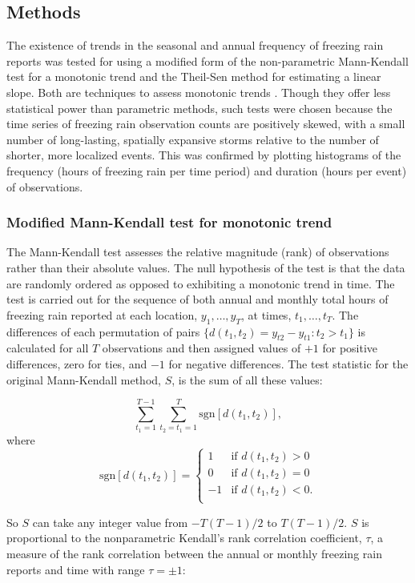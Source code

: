 \documentclass[twocol]{ametsoc}
\begin{document}
\subsection{Methods}
The existence of trends in the seasonal and annual frequency of freezing rain reports was tested for using a modified form of the non-parametric Mann-Kendall test for a monotonic trend and the Theil-Sen method for estimating a linear slope. Both are techniques to assess monotonic trends \citep{chandler2011statistical}. Though they offer less statistical power than parametric methods, such tests were chosen because the time series of freezing rain observation counts are positively skewed, with a small number of long-lasting, spatially expansive storms relative to the number of shorter, more localized events. This was confirmed by plotting histograms of the frequency (hours of freezing rain per time period) and duration (hours per event) of observations.

\subsubsection{Modified Mann-Kendall test for monotonic trend}
The Mann-Kendall test assesses the relative magnitude (rank) of observations rather than their absolute values. The null hypothesis of the test is that the data are randomly ordered as opposed to exhibiting a monotonic trend in time. The test is carried out for the sequence of both annual and monthly total hours of freezing rain reported at each location, $y_1,\ldots,y_T$, at times, $t_1,\ldots,t_T$. The differences of each permutation of pairs $\{d(t_1,t_2)=y_{t2}-y_{t1}:t_2>t_1\}$ is calculated for all $T$ observations and then assigned values of $+1$ for positive differences, zero for ties, and $-1$ for negative differences. The test statistic for the original Mann-Kendall method, $S$, is the sum of all these values:

\[\sum_{t_1=1}^{T-1}\sum_{t_2=t_1=1}^T\text{sgn}[d(t_1,t_2)],\] where\\

\[\text{sgn}[d(t_1,t_2)]=\begin{cases} 1 & \text{if } d(t_1,t_2)>0\\ 0 & \text{if } d(t_1,t_2)=0\\ -1 & \text{if } d(t_1,t_2)<0.\\ \end{cases}\]

So $S$ can take any integer value from $-T(T-1)/2$ to $T(T-1)/2$. $S$ is proportional to the nonparametric Kendall's rank correlation coefficient, $\tau$, a measure of the rank correlation between the annual or monthly freezing rain reports and time with range $\tau=\pm1$:
\end{document}
